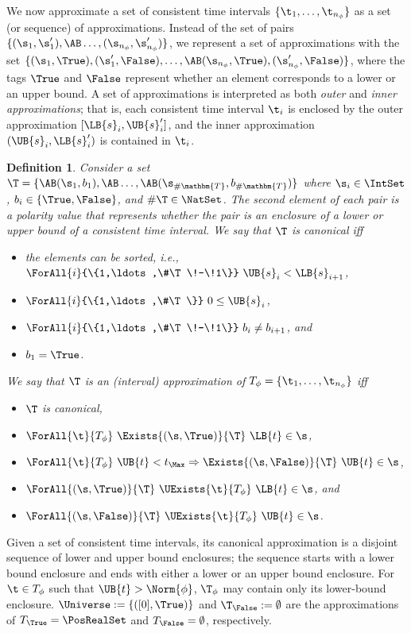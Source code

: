 \documentclass[paper]{ieice}
\newtheorem{definition}{Definition}
\begin{document}
We now approximate a set of consistent time intervals $\{ \t_1,\ldots, \t_{n_\phi} \}$ as a set (or sequence) of approximations.
Instead of the set of pairs $\{ (\s_1, \s'_1), \AB \ldots, (\s_{n_\phi}, \s'_{n_\phi}) \}$,
we represent a set of approximations with the set $\{ (\s_1,\True), (\s'_1,\False), \ldots, \AB (\s_{n_\phi},\True), (\s'_{n_\phi},\False) \}$, where the tags $\True$ and $\False$ represent whether an element corresponds to a lower or an upper bound.
A set of approximations is interpreted as both \emph{outer} and \emph{inner approximations};
that is, each consistent time interval $\t_i$ is enclosed by the outer approximation $[\LB{s}_i,\UB{s}_i']$, and the inner approximation $(\UB{s}_i,\LB{s}'_i)$ is contained in  $\t_i$.
\begin{definition} \label{d:approxs}
	Consider a set $\T = \{\AB (\s_1,b_1), \AB \ldots, \AB (\s_{\#\mathbm{T}}, b_{\#\mathbm{T}})\}$ where $\s_i \in \IntSet$, $b_i \in \{\True,\False\}$, and $\#\T\in\NatSet$.
	The second element of each pair is a \emph{polarity value} that represents whether the pair is an enclosure of a lower or upper bound of a consistent time interval.
We say that $\T$ is \emph{canonical} iff
	\begin{itemize}
		\item the elements can be sorted, i.e.,\\ $\ForAll{i}{\{1,\ldots,\#\T\!-\!1\}}~ \UB{s}_i < \LB{s}_{i+1}$,
		\item $\ForAll{i}{\{1,\ldots,\#\T\}}~ 0 \leq \UB{s}_i$, 
		\item $\ForAll{i}{\{1,\ldots,\#\T\!-\!1\}}~ b_i \neq b_{i+1}$, and
		\item $b_1 = \True$.
	\end{itemize}
We say that $\T$ is an \emph{(interval) approximation} of $T_\phi = \{\t_1,\ldots, \t_{n_\phi}\}$
iff
	\begin{itemize}
	\item $\T$ is canonical,
	\item $\ForAll{\t}{T_\phi}~ \Exists{(\s,\True)}{\T}~ \LB{t} \in \s$, 
	\item $\ForAll{\t}{T_\phi}~ \UB{t}<t_\Max \Rightarrow \Exists{(\s,\False)}{\T}~ \UB{t} \in \s$, 
	\item $\ForAll{(\s,\True)} {\T}~ \UExists{\t}{T_\phi}~ \LB{t} \in \s$, and
	\item $\ForAll{(\s,\False)}{\T}~ \UExists{\t}{T_\phi}~ \UB{t} \in \s$.
	\end{itemize}
\end{definition}
Given a set of consistent time intervals, its canonical approximation is a disjoint sequence of lower and upper bound enclosures; the sequence starts with a lower bound enclosure and ends with either a lower or an upper bound enclosure.
For $\t\in T_\phi$ such that $\UB{t} > \Norm{\phi}$, $\T_\phi$ may contain only its lower-bound enclosure.
$\Universe := \{([0],\True)\}$ and $\T_\False := \emptyset$ are the approximations of $T_\True=\PosRealSet$ and $T_\False=\emptyset$, respectively.
\end{document}
